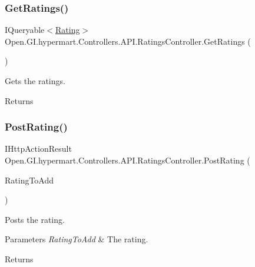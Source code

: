 \subsubsection{\texorpdfstring{Get\+Ratings()}{GetRatings()}}
{\footnotesize\ttfamily I\+Queryable$<$\hyperlink{class_open_1_1_g_i_1_1hypermart_1_1_models_1_1_rating}{Rating}$>$ Open.\+G\+I.\+hypermart.\+Controllers.\+A\+P\+I.\+Ratings\+Controller.\+Get\+Ratings (\begin{DoxyParamCaption}{ }\end{DoxyParamCaption})}



Gets the ratings. 

\begin{DoxyReturn}{Returns}

\end{DoxyReturn}
\hypertarget{class_open_1_1_g_i_1_1hypermart_1_1_controllers_1_1_a_p_i_1_1_ratings_controller_a9d6b1b9e543bf0272c559a928a39541c}{}\label{class_open_1_1_g_i_1_1hypermart_1_1_controllers_1_1_a_p_i_1_1_ratings_controller_a9d6b1b9e543bf0272c559a928a39541c} 
\subsubsection{\texorpdfstring{Post\+Rating()}{PostRating()}}
{\footnotesize\ttfamily I\+Http\+Action\+Result Open.\+G\+I.\+hypermart.\+Controllers.\+A\+P\+I.\+Ratings\+Controller.\+Post\+Rating (\begin{DoxyParamCaption}\item[{\hyperlink{class_open_1_1_g_i_1_1hypermart_1_1_data_transformation_objects_1_1_rating_information_d_t_o}{Rating\+Information\+D\+TO}}]{Rating\+To\+Add }\end{DoxyParamCaption})}



Posts the rating. 


\begin{DoxyParams}{Parameters}
{\em Rating\+To\+Add} & The rating.\\
\hline
\end{DoxyParams}
\begin{DoxyReturn}{Returns}

\end{DoxyReturn}
\hypertarget{class_open_1_1_g_i_1_1hypermart_1_1_controllers_1_1_a_p_i_1_1_ratings_controller_a35f91cb72bc50655eae8e19780adb980}{}\label{class_open_1_1_g_i_1_1hypermart_1_1_controllers_1_1_a_p_i_1_1_ratings_controller_a35f91cb72bc50655eae8e19780adb980} 
